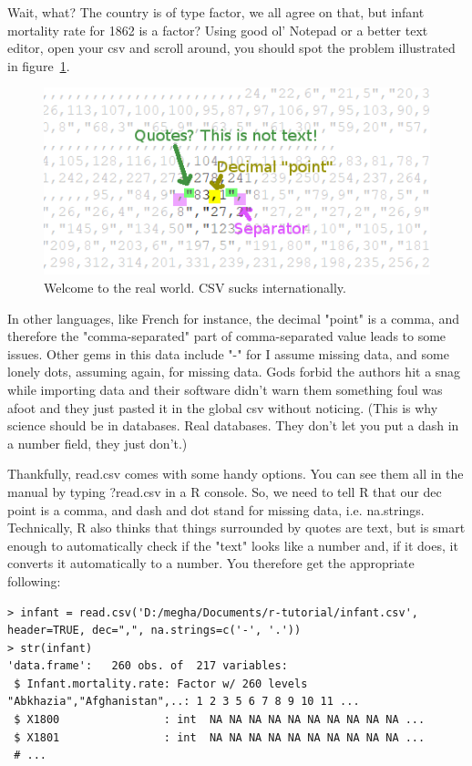 \documentclass{report}
\newcommand{\code}[1]{\textsf{\ttfamily #1}}
\begin{document}
Wait, what? The country is of type factor, we all agree on that, but infant mortality rate for 1862 is a factor? Using good ol' Notepad or a better text editor, open your csv and scroll around, you should spot the problem illustrated in figure~\ref{fig:welcome}.
\begin{figure}[h]
	\centering
	\includegraphics[width=1.0\textwidth]{welcometotherealworld.png}
	\caption{Welcome to the real world. CSV sucks internationally.}
\label{fig:welcome}
\end{figure}

In other languages, like French for instance, the decimal "point" is a comma, and therefore the "comma-separated" part of comma-separated value leads to some issues. Other gems in this data include "-" for I assume missing data, and some lonely dots, assuming again, for missing data. Gods forbid the authors hit a snag while importing data and their software didn't warn them something foul was afoot and they just pasted it in the global csv without noticing. (This is why science should be in databases. Real databases. They don't let you put a dash in a number field, they just don't.)

Thankfully, \code{read.csv} comes with some handy options. You can see them all in the manual by typing \code{?read.csv} in a R console. So, we need to tell R that our \code{dec} point is a comma, and dash and dot stand for missing data, i.e. \code{na.strings}. Technically, R also thinks that things surrounded by quotes are text, but is smart enough to automatically check if the "text" looks like a number and, if it does, it converts it automatically to a number. You therefore get the appropriate following:
\begin{verbatim}
> infant = read.csv('D:/megha/Documents/r-tutorial/infant.csv', header=TRUE, dec=",", na.strings=c('-', '.'))
> str(infant)
'data.frame':   260 obs. of  217 variables:
 $ Infant.mortality.rate: Factor w/ 260 levels "Abkhazia","Afghanistan",..: 1 2 3 5 6 7 8 9 10 11 ...
 $ X1800                : int  NA NA NA NA NA NA NA NA NA NA ...
 $ X1801                : int  NA NA NA NA NA NA NA NA NA NA ...
 # ...
 \end{verbatim}
\end{document}
